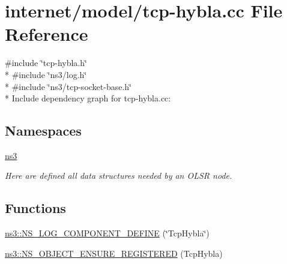 \hypertarget{tcp-hybla_8cc}{}\section{internet/model/tcp-\/hybla.cc File Reference}
\label{tcp-hybla_8cc}
{\ttfamily \#include \char`\"{}tcp-\/hybla.\+h\char`\"{}}\\*
{\ttfamily \#include \char`\"{}ns3/log.\+h\char`\"{}}\\*
{\ttfamily \#include \char`\"{}ns3/tcp-\/socket-\/base.\+h\char`\"{}}\\*
Include dependency graph for tcp-\/hybla.cc\+:
\subsection*{Namespaces}
\begin{DoxyCompactItemize}
\item 
 \hyperlink{namespacens3}{ns3}
\begin{DoxyCompactList}\small\item\em Here are defined all data structures needed by an O\+L\+SR node. \end{DoxyCompactList}\end{DoxyCompactItemize}
\subsection*{Functions}
\begin{DoxyCompactItemize}
\item 
\hyperlink{namespacens3_a8f8b20a3de0aa583c6d0aa3d83525c69}{ns3\+::\+N\+S\+\_\+\+L\+O\+G\+\_\+\+C\+O\+M\+P\+O\+N\+E\+N\+T\+\_\+\+D\+E\+F\+I\+NE} (\char`\"{}Tcp\+Hybla\char`\"{})
\item 
\hyperlink{namespacens3_a3a7e497662ba8b63ed67962a96fea346}{ns3\+::\+N\+S\+\_\+\+O\+B\+J\+E\+C\+T\+\_\+\+E\+N\+S\+U\+R\+E\+\_\+\+R\+E\+G\+I\+S\+T\+E\+R\+ED} (Tcp\+Hybla)
\end{DoxyCompactItemize}
